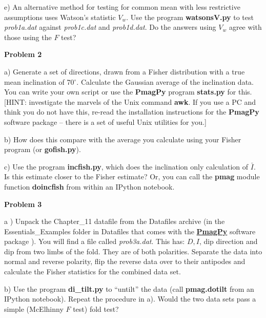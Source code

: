 {e)  An alternative method for testing for common mean with less restrictive assumptions uses  Watson's statistic $V_w$.  Use the program {\bf watsonsV.py} to  test {\it prob1a.dat} against {\it prob1c.dat} and {\it prob1d.dat}.  Do the answers  using $V_w$ agree with those using the $F$ test?     



{\bf Problem 2} 

a)  Generate a set of directions, drawn from a Fisher distribution with a true mean inclination of 70$^{\circ}$.   Calculate the Gaussian average of the  inclination data.  You can write your own script or use the {\bf PmagPy} program {\bf stats.py} for this.  [HINT: investigate the marvels of the Unix command {\bf awk}.  If you use a PC and think you do not have this, re-read the installation instructions for the {\bf PmagPy} software package -- there is a set of useful Unix utilities for you.] 

b) How does this compare with the average you calculate using your Fisher program (or {\bf gofish.py}).

c) Use the program {\bf incfish.py}, which does the inclination only calculation of $\bar I$.  Is this estimate closer to the Fisher estimate?   Or, you can call the {\bf pmag} module function {\bf doincfish} from within an IPython notebook.  

{\bf Problem 3}

a ) Unpack the Chapter\_11 datafile from the Datafiles archive (in the Essentials\_Examples folder in Datafiles that comes with the \href{http://earthref.org/PmagPy/cookbook}{\bf PmagPy} software package ).   You will find a file called {\it prob3a.dat}.   This has:   $D, I$, dip direction and dip from two limbs of the fold.    They are of both polarities.   Separate the data into normal and reverse polarity,  flip the reverse data over to their antipodes and calculate the Fisher statistics for the combined data set.   


b)     Use the program {\bf di\_tilt.py} to ``untilt'' the data (call {\bf pmag.dotilt} from an IPython notebook).   Repeat the procedure in a).     Would the two data sets pass a simple (McElhinny $F$ test) fold test?  

}
